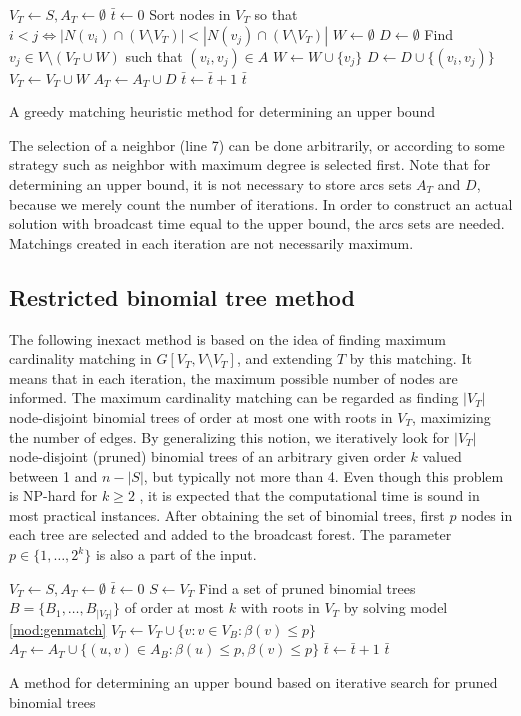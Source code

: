 \begin{algorithm}[]
$V_T\leftarrow S, A_T \leftarrow \emptyset$\;
$\bar{t}\leftarrow 0$\;
 {
	Sort nodes in $V_T$ so that $i<j\Leftrightarrow |N(v_i)\cap(V\setminus V_T)|<|N(v_j)\cap (V\setminus V_T)|$\;
	$W\leftarrow\emptyset$\;
	$D\leftarrow\emptyset$\;
	 {
		Find $v_j\in V\setminus (V_T\cup W)$ such that $(v_i,v_j)\in A$\;
		$W\leftarrow W\cup\{v_j\}$\;
		$D\leftarrow D\cup\{\left(v_i,v_j\right)\}$\;
	}
	$V_T\leftarrow V_T\cup W$\;
	$A_T\leftarrow A_T\cup D$\;
	$\bar{t}\leftarrow \bar{t}+1$\;
}
\Return $\bar{t}$\;
 \caption{A greedy matching heuristic method for determining an upper bound}
\label{alg:matchheur}
\end{algorithm}
The selection of a neighbor (line 7) can be done arbitrarily, or according to some strategy such as neighbor with maximum degree is selected first.
Note that for determining an upper bound, it is not necessary to store arcs sets $A_T$ and $D$, because we merely count the number of iterations.
In order to construct an actual solution with broadcast time equal to the upper bound, the arcs sets are needed.
Matchings created in each iteration are not necessarily maximum.

\subsection{Restricted binomial tree method}

The following inexact method is based on the idea of finding maximum cardinality matching in $G\left[V_T,V\setminus V_T\right]$, and extending $T$ by this matching.
It means that in each iteration, the maximum possible number of nodes are informed.
The maximum cardinality matching can be regarded as finding $|V_T|$ node-disjoint  binomial trees of order at most one with roots in $V_T$, maximizing the number of edges.
By generalizing this notion, we iteratively look for $|V_T|$ node-disjoint (pruned) binomial trees of an arbitrary given order $k$ valued between 1 and $n-|S|$, but typically not more than 4.
Even though this problem is NP-hard for $k\geq 2$ \cite{jansen95}, it is expected that the computational time is sound in most practical instances.
After obtaining the set of binomial trees, first $p$ nodes in each tree are selected and added to the broadcast forest.
The parameter $p\in \{1,\dots,2^k\}$ is also a part of the input.
\begin{algorithm}[]
$V_T\leftarrow S, A_T \leftarrow \emptyset$\;
$\bar{t}\leftarrow 0$\;
 {
	$S\leftarrow V_T$\;
	Find a set of pruned binomial trees $B=\{B_1,\dots,B_{|V_T|}\}$ of order at most $k$ with roots in $V_T$ by solving model \eqref{mod:genmatch}\;
	$V_T\leftarrow V_T\cup \{v:v\in V_B:\beta(v)\leq p\}$\;
	$A_T\leftarrow A_T\cup \{(u,v)\in A_B: \beta(u)\leq p,\beta(v)\leq p\}$\;
	$\bar{t}\leftarrow \bar{t}+1$\;
}
\Return $\bar{t}$\;
 \caption{A method for determining an upper bound based on iterative search for pruned binomial trees}
\label{alg:match}
\end{algorithm}

